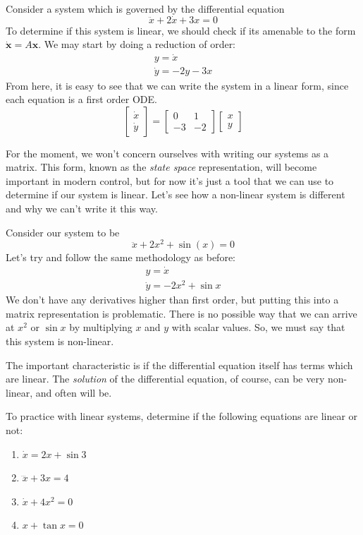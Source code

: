 \begin{example}\label{ex: linear system}
    Consider a system which is governed by the differential equation
    $$\ddot{x}+2\dot{x}+3x=0$$
To determine if this system is linear, we should check if its amenable to the form $\bm{\dot{x}}=A\bm{x}$. We may start by doing a reduction of order:
\begin{gather}
    y=\dot{x}\\
    \dot{y}=-2y-3x
\end{gather}
From here, it is easy to see that we can write the system in a linear form, since each equation is a first order ODE.
$$\begin{bmatrix}
    \dot{x}\\
    \dot{y}\end{bmatrix}=\begin{bmatrix}
        0&1\\-3&-2    \end{bmatrix}\begin{bmatrix}
            x\\y
        \end{bmatrix}$$
\end{example}

For the moment, we won't concern ourselves with writing our systems as a matrix. This form, known as the \textit{state space} representation, will become important in modern control, but for now it's just a tool that we can use to determine if our system is linear. Let's see how a non-linear system is different and why we can't write it this way.

\begin{example}
Consider our system to be
$$\ddot{x}+2x^2+\sin(x)=0$$
Let's try and follow the same methodology as before:
\begin{gather}
    y=\dot{x}\\
    \dot{y}=-2x^2+\sin{x}
\end{gather}
We don't have any derivatives higher than first order, but putting this into a matrix representation is problematic. There is no possible way that we can arrive at $x^2$ or $\sin{x}$ by multiplying $x$ and $y$ with scalar values. So, we must say that this system is non-linear.

The important characteristic is if the differential equation itself has terms which are linear. The \textit{solution} of the differential equation, of course, can be very non-linear, and often will be.
\end{example}
\begin{exercise}
To practice with linear systems, determine if the following equations are linear or not:
\begin{enumerate}
    \item $\dot{x}=2x+\sin{3}$
    \item $\dddot{x}+3x=4$
    \item $\dot{x}+4x^2=0$
    \item $x+\tan{x}=0$
\end{enumerate}
\end{exercise}

